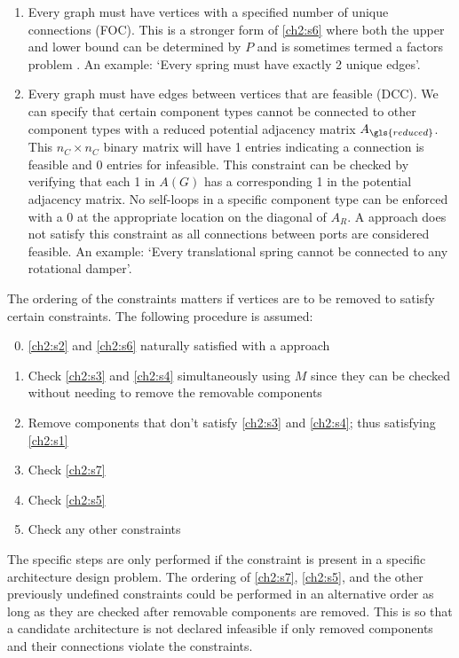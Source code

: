 \begin{enumerate}[label=$S_{\!\arabic*}$]
\item \label{ch2:s7} Every graph must have vertices with a specified number of unique connections (FOC). This is a stronger form of \ref{ch2:s6} where both the upper and lower bound can be determined by $P$ and is sometimes termed a factors problem  \cite[p.~218]{Lawler1976a}. An example: `Every spring must have exactly 2 unique edges'.

\item \label{ch2:s5} Every graph must have edges between vertices that are feasible (DCC). We can specify that certain component types cannot be connected to other component types with a reduced potential adjacency matrix $A_{\gls{reduced}}$. This $n_C \times n_C$ binary matrix will have 1 entries indicating a connection is feasible and 0 entries for infeasible. 
This constraint can be checked by verifying that each 1 in $A(G)$ has a corresponding 1 in the potential adjacency matrix. No self-loops in a specific component type can be enforced with a 0 at the appropriate location on the diagonal of $A_R$. A \mypm{} approach does not satisfy this constraint as all connections between ports are considered feasible.  An example: `Every translational spring cannot be connected to any rotational damper'.

\end{enumerate} 

The ordering of the constraints matters if vertices are to be removed to satisfy certain constraints. The following procedure is assumed:
\begin{enumerate}[nosep]
\setcounter{enumi}{-1}
\item \ref{ch2:s2} and \ref{ch2:s6} naturally satisfied with a \mypm{} approach
\item \label{ch2:step1} Check \ref{ch2:s3} and \ref{ch2:s4} simultaneously using $M$ since they can be checked without needing to remove the removable components
\item \label{ch2:step2} Remove components that don't satisfy \ref{ch2:s3} and \ref{ch2:s4}; thus satisfying \ref{ch2:s1} 
\item Check \ref{ch2:s7} 
\item \label{ch2:step4} Check \ref{ch2:s5}
\item Check any other constraints
\end{enumerate} 

\noindent The specific steps are only performed if the constraint is present in a specific architecture design problem. The ordering of \ref{ch2:s7}, \ref{ch2:s5}, and the other previously undefined constraints could be performed in an alternative order as long as they are checked after removable components are removed. This is so that a candidate architecture is not declared infeasible if only removed components and their connections violate the constraints.

